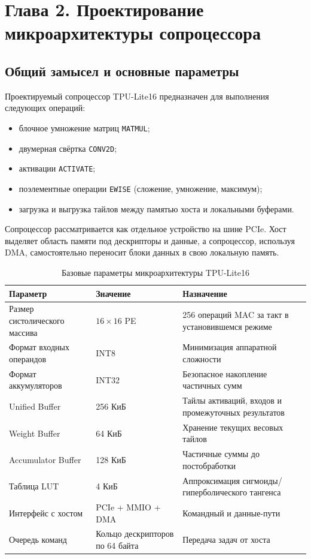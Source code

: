 \documentclass[12pt,a4paper]{article}
\begin{document}
\section{Глава 2. Проектирование микроархитектуры сопроцессора}

\subsection{Общий замысел и основные параметры}

Проектируемый сопроцессор TPU-Lite16 предназначен для выполнения следующих операций:
\begin{itemize}
    \item блочное умножение матриц \texttt{MATMUL};
    \item двумерная свёртка \texttt{CONV2D};
    \item активации \texttt{ACTIVATE};
    \item поэлементные операции \texttt{EWISE} (сложение, умножение, максимум);
    \item загрузка и выгрузка тайлов между памятью хоста и локальными буферами.
\end{itemize}

Сопроцессор рассматривается как отдельное устройство на шине PCIe. Хост выделяет область памяти под дескрипторы и данные, а сопроцессор, используя DMA, самостоятельно переносит блоки данных в свою локальную память.

\begin{table}[H]
    \centering
    \caption{Базовые параметры микроархитектуры TPU-Lite16}
    \begin{tabular}{|L{5.0cm}|L{3.5cm}|L{6.0cm}|}
        \hline
        \textbf{Параметр} & \textbf{Значение} & \textbf{Назначение} \\
        \hline
        Размер систолического массива & \(16 \times 16\) PE & 256 операций MAC за такт в установившемся режиме \\
        \hline
        Формат входных операндов & INT8 & Минимизация аппаратной сложности \\
        \hline
        Формат аккумуляторов & INT32 & Безопасное накопление частичных сумм \\
        \hline
        Unified Buffer & 256 КиБ & Тайлы активаций, входов и промежуточных результатов \\
        \hline
        Weight Buffer & 64 КиБ & Хранение текущих весовых тайлов \\
        \hline
        Accumulator Buffer & 128 КиБ & Частичные суммы до постобработки \\
        \hline
        Таблица LUT & 4 КиБ & Аппроксимация сигмоиды/гиперболического тангенса \\
        \hline
        Интерфейс с хостом & PCIe + MMIO + DMA & Командный и данные-пути \\
        \hline
        Очередь команд & Кольцо дескрипторов по 64 байта & Передача задач от хоста \\
        \hline
    \end{tabular}
\end{table}
\end{document}
